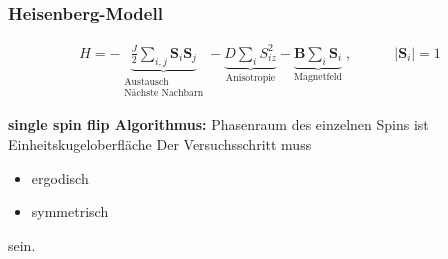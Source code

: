 \documentclass[12pt]{article}
\begin{document}
\subsubsection{Heisenberg-Modell}
\begin{align}
H= - \underbrace{\frac{J}{2} \sum_{i,j} \mathbf{S}_i \mathbf{S}_j}_{\substack{\text{Austausch} \\ \text{Nächste Nachbarn}}}
 - \underbrace{ D \sum_i S_{iz}^2}_\text{Anisotropie} - \underbrace{\mathbf{B} \sum_i \mathbf{S}_i}_\text{Magnetfeld} \; , \quad \quad \quad \vert \mathbf{S}_i \vert =1
\end{align}

\textbf{single spin flip Algorithmus:} Phasenraum des einzelnen Spins ist Einheitskugeloberfläche 
Der Versuchsschritt muss
\begin{itemize}
\item ergodisch
\item symmetrisch
\end{itemize} %
sein. 
\end{document}
